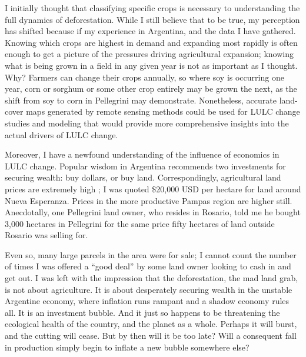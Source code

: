 I initially thought that classifying specific crops is necessary to understanding the full dynamics of deforestation. While I still believe that to be true, my perception has shifted because if my experience in Argentina, and the data I have gathered. Knowing which crops are highest in demand and expanding most rapidly is often enough to get a picture of the pressures driving agricultural expansion; knowing what is being grown in a field in any given year is not as important as I thought. Why? Farmers can change their crops annually, so where soy is occurring one year, corn or sorghum or some other crop entirely may be grown the next, as the shift from soy to corn in Pellegrini may demonstrate. Nonetheless, accurate land-cover maps generated by remote sensing methods could be used for LULC change studies and modeling that would provide more comprehensive insights into the actual drivers of LULC change.

Moreover, I have a newfound understanding of the influence of economics in LULC change. Popular wisdom in Argentina recommends two investments for securing wealth: buy dollars, or buy land. Correspondingly, agricultural land prices are extremely high \autocite{mercopress2010prime}; I was quoted \$20,000 USD per hectare for land around Nueva Esperanza. Prices in the more productive Pampas region are higher still. Anecdotally, one Pellegrini land owner, who resides in Rosario, told me he bought 3,000 hectares in Pellegrini for the same price fifty hectares of land outside Rosario was selling for.

Even so, many large parcels in the area were for sale; I cannot count the number of times I was offered a ``good deal'' by some land owner looking to cash in and get out. I was left with the impression that the deforestation, the mad land grab, is not about agriculture. It is about desperately securing wealth in the unstable Argentine economy, where inflation runs rampant and a shadow economy rules all. It is an investment bubble. And it just so happens to be threatening the ecological health of the country, and the planet as a whole. Perhaps it will burst, and the cutting will cease. But by then will it be too late? Will a consequent fall in production simply begin to inflate a new bubble somewhere else?